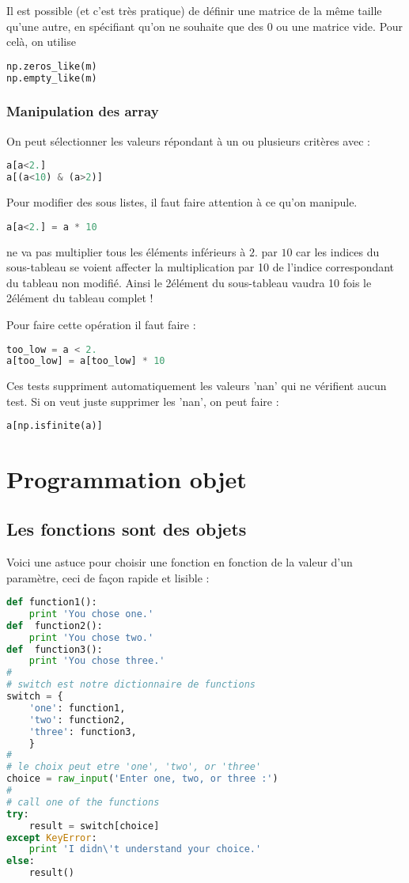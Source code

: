 \documentclass[a4paper,twoside]{article}
\begin{document}
Il est possible (et c'est très pratique) de définir une matrice de la même taille qu'une autre, en spécifiant qu'on ne souhaite que des 0 ou une matrice vide. Pour celà, on utilise
\begin{lstlisting}[language=python]
np.zeros_like(m)
np.empty_like(m)
\end{lstlisting}

\subsubsection{Manipulation des array}
On peut sélectionner les valeurs répondant à un ou plusieurs critères avec :
\begin{lstlisting}[language=python]
a[a<2.]
a[(a<10) & (a>2)]
\end{lstlisting}

Pour modifier des sous listes, il faut faire attention à ce qu'on manipule. 

\begin{lstlisting}[language=python]
a[a<2.] = a * 10
\end{lstlisting}
ne va pas multiplier tous les éléments inférieurs à $2.$ par $10$ car les indices du sous-tableau se voient affecter la multiplication par 10 de l'indice correspondant du tableau non modifié. Ainsi le 2\ieme élément du sous-tableau vaudra 10 fois le 2\ieme élément du tableau complet !

Pour faire cette opération il faut faire :
\begin{lstlisting}[language=python]
too_low = a < 2.
a[too_low] = a[too_low] * 10
\end{lstlisting}

\bigskip

Ces tests suppriment automatiquement les valeurs 'nan' qui ne vérifient aucun test. Si on veut juste supprimer les 'nan', on peut faire :
\begin{lstlisting}[language=python]
a[np.isfinite(a)]
\end{lstlisting}



\section{Programmation objet}
\subsection{Les fonctions sont des objets}
Voici une astuce pour choisir une fonction en fonction de la valeur d'un paramètre, ceci de façon rapide et lisible :
\begin{lstlisting}[language=python]
def function1():
    print 'You chose one.'
def  function2():
    print 'You chose two.'
def  function3():
    print 'You chose three.'
#
# switch est notre dictionnaire de functions
switch = {
    'one': function1,
    'two': function2,
    'three': function3,
    }
#
# le choix peut etre 'one', 'two', or 'three'
choice = raw_input('Enter one, two, or three :')
#
# call one of the functions
try:
    result = switch[choice]
except KeyError:
    print 'I didn\'t understand your choice.'
else:
    result()
\end{lstlisting}
\end{document}
